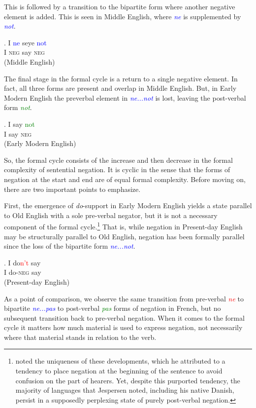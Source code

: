\documentclass[linguex]{sp}
\theoremstyle{definition} \newtheorem{definition}{Definition}
\begin{document}
This is followed by a transition to the bipartite form where another negative element is added. This is seen in Middle English, where \emph{\textcolor{blue}{ne}} is supplemented by \emph{\textcolor{blue}{not}}.

\exg. I \textcolor{blue}{ne} seye \textcolor{blue}{not}\\
      I \textsc{neg} say \textsc{neg}\\
      (Middle English)

The final stage in the formal cycle is a return to a single negative element. In fact, all three forms are present and overlap in Middle English. But, in Early Modern English the preverbal element in \emph{\textcolor{blue}{ne...not}} is lost, leaving the post-verbal form \emph{\textcolor{green}{not}}. 

\exg. I say \textcolor{green}{not}\\
      I say \textsc{neg}\\
      (Early Modern English)

So, the formal cycle consists of the increase and then decrease in the formal complexity of sentential negation. It is cyclic in the sense that the forms of negation at the start and end are of equal formal complexity. Before moving on, there are two important points to emphasize.

First, the emergence of \emph{do}-support in Early Modern English yields a state parallel to Old English with a sole pre-verbal negator, but it is not a necessary component of the formal cycle.\footnote{\citet[10]{jespersen:1917} noted the uniqueness of these developments, which he attributed to a tendency to place negation at the beginning of the sentence to avoid confusion on the part of hearers. Yet, despite this purported tendency, the majority of languages that Jespersen noted, including his native Danish, persist in a supposedly perplexing state of purely post-verbal negation.} That is, while negation in Present-day English may be structurally parallel to Old English, negation has been formally parallel since the loss of the bipartite form \emph{\textcolor{blue}{ne...not}}.

\exg. I do\textcolor{red}{n't} say\\
      I do-\textsc{neg} say\\
      (Present-day English)

As a point of comparison, we observe the same transition from pre-verbal \emph{\textcolor{red}{ne}} to bipartite \emph{\textcolor{blue}{ne...pas}} to post-verbal \emph{\textcolor{green}{pas}} forms of negation in French, but no subsequent transition back to pre-verbal negation. When it comes to the formal cycle it matters how much material is used to express negation, not necessarily where that material stands in relation to the verb.
\end{document}

